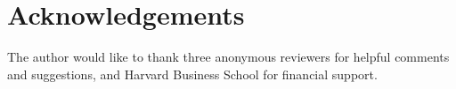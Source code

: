 \documentclass[conference]{IEEEtran}
\newcommand{\1}{\mathds{1}}
\begin{document}
\section*{Acknowledgements}

The author would like to thank three anonymous reviewers for helpful comments and suggestions, and Harvard Business School for financial support.

\vspace{0.1in}

\nocite{MSRChallenge2015}

\renewcommand{\bibfont}{\small}


\end{document}
